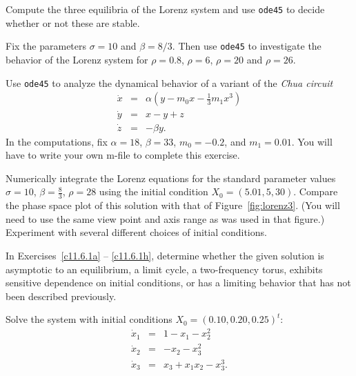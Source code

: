 \documentclass{ximera}
\begin{document}
\EXER

\CEXER



\begin{exercise} \label{c11.4.1}
Compute the three equilibria of the Lorenz system 
and use {\tt ode45} to decide whether or not these are stable.
\end{exercise}

\begin{exercise} \label{c11.4.2}
Fix the parameters $\sigma=10$ and $\beta = 8/3$.  Then
use {\tt ode45} to investigate the behavior of the Lorenz system
 for $\rho=0.8$, $\rho=6$, $\rho=20$ and $\rho=26$.
\end{exercise}

\begin{exercise} \label{c11.4.3}
Use {\tt ode45} to analyze the dynamical behavior of a variant of the 
{\em Chua circuit}
\begin{eqnarray*}
  \dot{x} &=& \alpha\left(y-m_0x-\frac{1}{3}m_1x^3\right) \\
  \dot{y} &=& x-y+z \\
  \dot{z} &=& - \beta y.
\end{eqnarray*}
In the computations, fix $\alpha=18$, $\beta=33$, $m_0=-0.2$, and $m_1=0.01$.
You will have to write your own m-file to complete this exercise. 
\end{exercise}

\begin{exercise} \label{c11.4.3a}
Numerically integrate the Lorenz equations  for the standard 
parameter values $\sigma=10$, $\beta=\frac{8}{3}$, $\rho=28$ using the initial 
condition $X_0 =(5.01,5,30)$.  Compare the phase space plot of this solution 
with that of Figure~\ref{fig:lorenz3}.  (You will need to use the same view
point and axis range as was used in that figure.)  Experiment with several 
different choices of initial conditions.
\end{exercise}


\noindent In Exercises~\ref{c11.6.1a} -- \ref{c11.6.1h}, determine whether the 
given solution is asymptotic to an equilibrium, a limit cycle, a two-frequency 
torus, exhibits sensitive dependence on initial conditions, or has a limiting 
behavior that has not been described previously.

\begin{exercise}  \label{c11.6.1a}
Solve the system  with initial conditions 
$X_0 = (0.10, 0.20, 0.25)^t$:
\begin{equation*} \label{e11.6.1a}
\begin{array}{rcl} 
\dot{x}_1 & = & 1 - x_1 - x_2^2 \\
\dot{x}_2 & = & -x_2-x_3^2   \\
\dot{x}_3 & = & x_3 +x_1x_2-x_3^3.   \end{array} 
\end{equation*}
\end{exercise}
\end{document}
